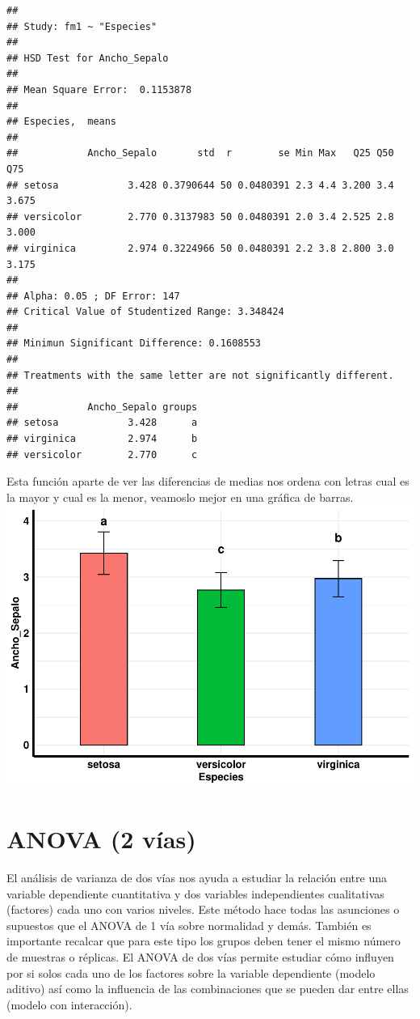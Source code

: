 \documentclass[
]{book}
\begin{document}
\begin{verbatim}
## 
## Study: fm1 ~ "Especies"
## 
## HSD Test for Ancho_Sepalo 
## 
## Mean Square Error:  0.1153878 
## 
## Especies,  means
## 
##            Ancho_Sepalo       std  r        se Min Max   Q25 Q50   Q75
## setosa            3.428 0.3790644 50 0.0480391 2.3 4.4 3.200 3.4 3.675
## versicolor        2.770 0.3137983 50 0.0480391 2.0 3.4 2.525 2.8 3.000
## virginica         2.974 0.3224966 50 0.0480391 2.2 3.8 2.800 3.0 3.175
## 
## Alpha: 0.05 ; DF Error: 147 
## Critical Value of Studentized Range: 3.348424 
## 
## Minimun Significant Difference: 0.1608553 
## 
## Treatments with the same letter are not significantly different.
## 
##            Ancho_Sepalo groups
## setosa            3.428      a
## virginica         2.974      b
## versicolor        2.770      c
\end{verbatim}

\hfill\break
Esta función aparte de ver las diferencias de medias nos ordena con letras cual es la mayor y cual es la menor, veamoslo mejor en una gráfica de barras.\\

\includegraphics{R_Manual_files/figure-latex/unnamed-chunk-259-1.pdf}

\newpage

\section{ANOVA (2 vías)}\label{anova-2-vuxedas}

El análisis de varianza de dos vías nos ayuda a estudiar la relación entre una variable dependiente cuantitativa y dos variables independientes cualitativas (factores) cada uno con varios niveles.
Este método hace todas las asunciones o supuestos que el ANOVA de 1 vía sobre normalidad y demás.
También es importante recalcar que para este tipo los grupos deben tener el mismo número de muestras o réplicas.
El ANOVA de dos vías permite estudiar cómo influyen por si solos cada uno de los factores sobre la variable dependiente (modelo aditivo) así como la influencia de las combinaciones que se pueden dar entre ellas (modelo con interacción).
\end{document}
